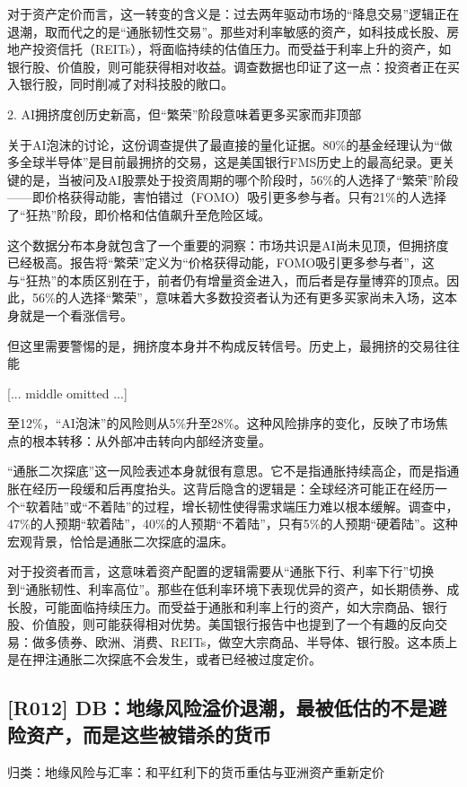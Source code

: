 \documentclass[11pt]{ctexart}
\begin{document}
对于资产定价而言，这一转变的含义是：过去两年驱动市场的“降息交易”逻辑正在退潮，取而代之的是“通胀韧性交易”。那些对利率敏感的资产，如科技成长股、房地产投资信托（REITs），将面临持续的估值压力。而受益于利率上升的资产，如银行股、价值股，则可能获得相对收益。调查数据也印证了这一点：投资者正在买入银行股，同时削减了对科技股的敞口。

2. AI拥挤度创历史新高，但“繁荣”阶段意味着更多买家而非顶部

关于AI泡沫的讨论，这份调查提供了最直接的量化证据。80\%的基金经理认为“做多全球半导体”是目前最拥挤的交易，这是美国银行FMS历史上的最高纪录。更关键的是，当被问及AI股票处于投资周期的哪个阶段时，56\%的人选择了“繁荣”阶段——即价格获得动能，害怕错过（FOMO）吸引更多参与者。只有21\%的人选择了“狂热”阶段，即价格和估值飙升至危险区域。

这个数据分布本身就包含了一个重要的洞察：市场共识是AI尚未见顶，但拥挤度已经极高。报告将“繁荣”定义为“价格获得动能，FOMO吸引更多参与者”，这与“狂热”的本质区别在于，前者仍有增量资金进入，而后者是存量博弈的顶点。因此，56\%的人选择“繁荣”，意味着大多数投资者认为还有更多买家尚未入场，这本身就是一个看涨信号。

但这里需要警惕的是，拥挤度本身并不构成反转信号。历史上，最拥挤的交易往往能

[... middle omitted ...]

至12\%，“AI泡沫”的风险则从5\%升至28\%。这种风险排序的变化，反映了市场焦点的根本转移：从外部冲击转向内部经济变量。

“通胀二次探底”这一风险表述本身就很有意思。它不是指通胀持续高企，而是指通胀在经历一段缓和后再度抬头。这背后隐含的逻辑是：全球经济可能正在经历一个“软着陆”或“不着陆”的过程，增长韧性使得需求端压力难以根本缓解。调查中，47\%的人预期“软着陆”，40\%的人预期“不着陆”，只有5\%的人预期“硬着陆”。这种宏观背景，恰恰是通胀二次探底的温床。

对于投资者而言，这意味着资产配置的逻辑需要从“通胀下行、利率下行”切换到“通胀韧性、利率高位”。那些在低利率环境下表现优异的资产，如长期债券、成长股，可能面临持续压力。而受益于通胀和利率上行的资产，如大宗商品、银行股、价值股，则可能获得相对优势。美国银行报告中也提到了一个有趣的反向交易：做多债券、欧洲、消费、REITs，做空大宗商品、半导体、银行股。这本质上是在押注通胀二次探底不会发生，或者已经被过度定价。

\subsection{[R012] DB：地缘风险溢价退潮，最被低估的不是避险资产，而是这些被错杀的货币}
{\small\color{refgray}归类：地缘风险与汇率：和平红利下的货币重估与亚洲资产重新定价}
\end{document}
